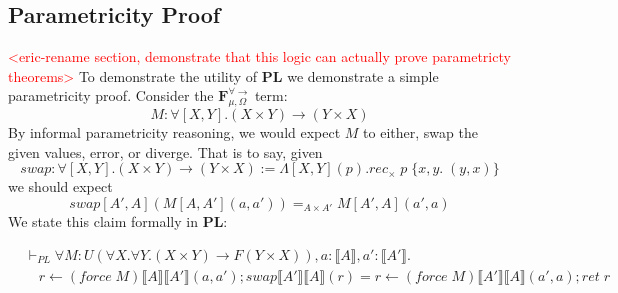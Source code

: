 \documentclass[acmsmall]{acmart}
\newcommand{\den}[1]{\llbracket #1\rrbracket}
\newcommand{\eric}[1]{\textcolor{red}{ <eric-#1> }}
\newcommand{\source}{$\mathbf{F}_{\mu,\Omega}^{\forall\to}\;$}
\newcommand{\pl}{$\mathbf{PL}$}
\begin{document}
\begin{comment}
To understand the utility of this principle, we can observe what it says for the universal type. For any $M,N : \forall X.\underline{B}$:
\[
  \forall Y,Z,R:Rel_v[Y,Z].\mathcal{C}[\underline{B}]_R(M[Y],N[Z]) \iff M =_{\forall X. \underline{B}} N
\]
\end{comment}

\subsection{Parametricity Proof}
\eric{rename section, demonstrate that this logic can actually prove parametricty theorems}
To demonstrate the utility of \pl\; we demonstrate a simple parametricity proof. Consider the \source term:
\[
  M : \forall [X,Y].(X \times Y) \to (Y\times X)
\]
By informal parametricity reasoning, we would expect $M$ to either, swap the given values, error, or diverge. That is to say, given 
\[
  swap : \forall[X,Y].(X \times Y) \to (Y \times X) := \Lambda [X,Y](p).rec_\times\;p\;\{x,y.\; (y,x)\}  
\]
we should expect 
\[
  swap[A',A](M[A,A'](a,a')) =_{A\times A'} M[A',A](a',a)
\]
We state this claim formally in \pl:
\begin{theorem}
\begin{align*} 
&\vdash_{PL}\forall M : U(\forall X.\forall Y. (X\times Y) \to F(Y \times X)),a:\den{A},a':\den{A'}.   \\
& \quad r \leftarrow (force\;M)\den{A}\den{A'}(a,a');swap\den{A'}\den{A}(r) = r \leftarrow (force\;M)\den{A'}\den{A}(a',a);ret\;r
\end{align*}
\end{theorem}
\end{document}

